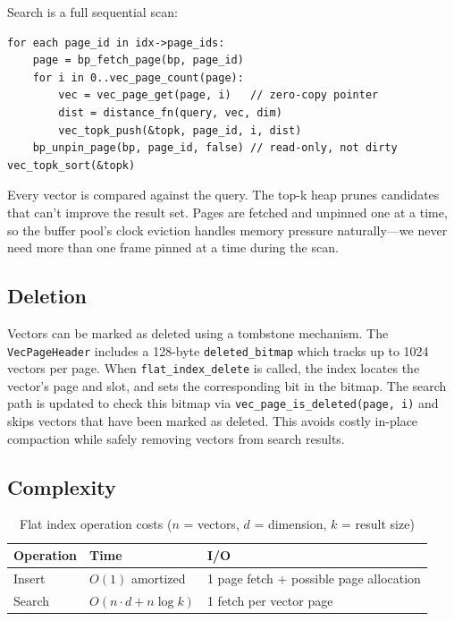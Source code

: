 \documentclass[12pt, a4paper]{report}
\begin{document}
Search is a full sequential scan:

\begin{lstlisting}
for each page_id in idx->page_ids:
    page = bp_fetch_page(bp, page_id)
    for i in 0..vec_page_count(page):
        vec = vec_page_get(page, i)   // zero-copy pointer
        dist = distance_fn(query, vec, dim)
        vec_topk_push(&topk, page_id, i, dist)
    bp_unpin_page(bp, page_id, false) // read-only, not dirty
vec_topk_sort(&topk)
\end{lstlisting}

Every vector is compared against the query. The top-k heap prunes
candidates that can't improve the result set. Pages are fetched and
unpinned one at a time, so the buffer pool's clock eviction handles memory
pressure naturally---we never need more than one frame pinned at a time
during the scan.


\subsection{Deletion}

Vectors can be marked as deleted using a tombstone mechanism. 
The \texttt{VecPageHeader} includes a 128-byte \texttt{deleted\_bitmap} which tracks up to 1024 vectors per page.
When \texttt{flat\_index\_delete} is called, the index locates the vector's page and slot, and sets the corresponding bit in the bitmap. 
The search path is updated to check this bitmap via \texttt{vec_page_is_deleted(page, i)} and skips vectors that have been marked as deleted. This avoids costly in-place compaction while safely removing vectors from search results.

\subsection{Complexity}

\begin{table}[h]
\centering
\begin{tabular}{lll}
\toprule
\textbf{Operation} & \textbf{Time} & \textbf{I/O} \\
\midrule
Insert     & $O(1)$ amortized & 1 page fetch + possible page allocation \\
Search     & $O(n \cdot d + n \log k)$ & 1 fetch per vector page \\
\bottomrule
\end{tabular}
\caption{Flat index operation costs ($n$ = vectors, $d$ = dimension, $k$ = result size)}
\end{table}
\end{document}

